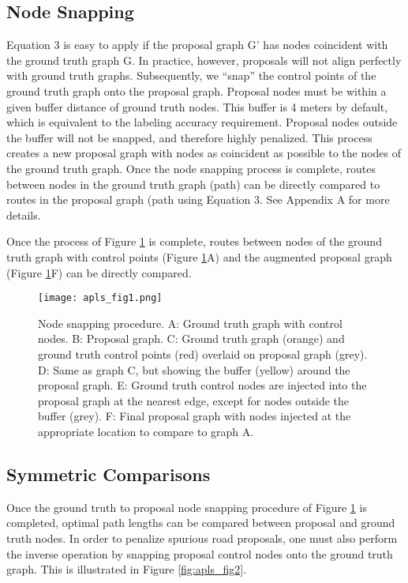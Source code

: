 \documentclass{article}
\begin{document}
\subsection{Node Snapping}

Equation 3 is easy to apply if the proposal graph G' has nodes coincident with the ground truth graph G. In practice, however, proposals will not align perfectly with ground truth graphs. Subsequently, we ``snap'' the control points of the ground truth graph onto the proposal graph. Proposal nodes must be within a given buffer distance of ground truth nodes.  This buffer is 4 meters by default, which is equivalent to the labeling accuracy requirement.  Proposal nodes outside the buffer will not be snapped, and therefore highly penalized.  This process creates a new proposal graph with nodes as coincident as possible to the nodes of the ground truth graph.  Once the node snapping process is complete, routes between nodes in the ground truth graph (path) can be directly compared to routes in the proposal graph (path using Equation 3.  
See Appendix A for more details.

Once the process of Figure \ref{fig:apls_fig1} is complete, routes between nodes of  the ground truth graph with control points (Figure \ref{fig:apls_fig1}A) and the augmented proposal graph (Figure \ref{fig:apls_fig1}F) can be directly compared.

\begin{figure}[h]
  \centering
     \texttt{[image: apls\_fig1.png]}
  \caption{Node snapping procedure. A: Ground truth graph with control nodes. B: Proposal graph. C: Ground truth graph (orange) and ground truth control points (red) overlaid on proposal graph (grey). D: Same as graph C, but showing the buffer (yellow) around the proposal graph. E: Ground truth control nodes are injected into the proposal graph at the nearest edge, except for nodes outside the buffer (grey). F: Final proposal graph with nodes injected at the appropriate location to compare to graph A.}
  \label{fig:apls_fig1}
\end{figure}

\subsection{Symmetric Comparisons}

Once the ground truth to proposal node snapping procedure of Figure \ref{fig:apls_fig1} is completed, optimal path lengths can be compared between proposal and ground truth nodes. In order to penalize spurious road proposals, one must also perform the inverse operation by snapping proposal control nodes onto the ground truth graph. This is illustrated in Figure \ref{fig:apls_fig2}.
\end{document}
